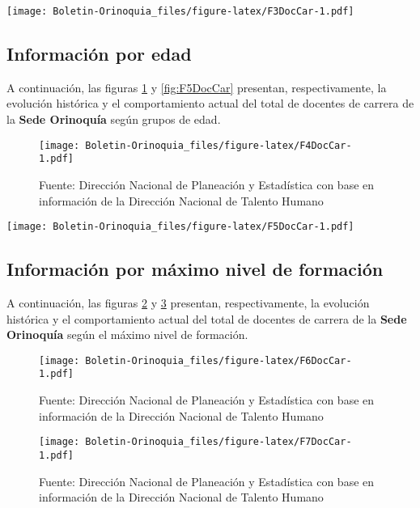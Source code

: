\documentclass[
]{book}
\begin{document}
\texttt{[image: Boletin-Orinoquia\_files/figure-latex/F3DocCar-1.pdf]}

\hypertarget{informaciuxf3n-por-edad-6}{%
\subsection{Información por edad}\label{informaciuxf3n-por-edad-6}}

A continuación, las figuras \ref{fig:F4DocCar} y \ref{fig:F5DocCar} presentan, respectivamente, la evolución histórica y el comportamiento actual del total de docentes de carrera de la \textbf{Sede Orinoquía} según grupos de edad.

\begin{figure}
\centering
\texttt{[image: Boletin-Orinoquia\_files/figure-latex/F4DocCar-1.pdf]}
\caption{\label{fig:F4DocCar}Fuente: Dirección Nacional de Planeación y Estadística con base en información de la Dirección Nacional de Talento Humano}
\end{figure}

\texttt{[image: Boletin-Orinoquia\_files/figure-latex/F5DocCar-1.pdf]}

\hypertarget{informaciuxf3n-por-muxe1ximo-nivel-de-formaciuxf3n}{%
\subsection{Información por máximo nivel de formación}\label{informaciuxf3n-por-muxe1ximo-nivel-de-formaciuxf3n}}

A continuación, las figuras \ref{fig:F6DocCar} y \ref{fig:F7DocCar} presentan, respectivamente, la evolución histórica y el comportamiento actual del total de docentes de carrera de la \textbf{Sede Orinoquía} según el máximo nivel de formación.

\begin{figure}
\centering
\texttt{[image: Boletin-Orinoquia\_files/figure-latex/F6DocCar-1.pdf]}
\caption{\label{fig:F6DocCar}Fuente: Dirección Nacional de Planeación y Estadística con base en información de la Dirección Nacional de Talento Humano}
\end{figure}

\begin{figure}
\centering
\texttt{[image: Boletin-Orinoquia\_files/figure-latex/F7DocCar-1.pdf]}
\caption{\label{fig:F7DocCar}Fuente: Dirección Nacional de Planeación y Estadística con base en información de la Dirección Nacional de Talento Humano}
\end{figure}
\end{document}

